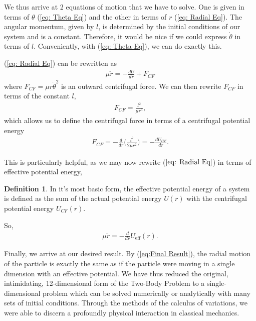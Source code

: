 \documentclass[10pt, psamsfonts]{amsart}
\theoremstyle{definition}
\newtheorem{defn}[thm]{Definition}
\theoremstyle{remark}
\numberwithin{equation}{section}
\begin{document}
We thus arrive at 2 equations of motion that we have to solve. One is given in terms of $\theta$ (\ref{eq: Theta Eq}) and the other in terms of $r$ (\ref{eq: Radial Eq}). The angular momentum, given by $l$, is determined by the initial conditions of our system and is a constant. Therefore, it would be nice if we could express $\dot{\theta}$ in terms of $l$. Conveniently, with (\ref{eq: Theta Eq}), we can do exactly this.

(\ref{eq: Radial Eq}) can be rewritten as 
\begin{align*}
  \label{eq:}
  \mu \ddot{r} = -\frac{dU}{dr} + F_{CF}
\end{align*}
where $F_{CF} = \mu r \dot{\theta}^2$ is an outward centrifugal force. We can then rewrite $F_{CF}$ in terms of the constant $l$,
\begin{gather*}
  F_{CF} = \frac{l^2}{\mu r^3},
\end{gather*}
which allows us to define the centrifugal force in terms of a centrifugal potential energy 
\begin{gather*}
  F_{CF} = -\frac{d}{dr} \bigg(\frac{l^2}{2\mu r^2}  \bigg) =  -\frac{dU_{CF}}{dr}.
\end{gather*}

This is particularly helpful, as we may now rewrite ($\ref{eq: Radial Eq}$) in terms of effective potential energy,
\begin{defn}
  In it's most basic form, the effective potential energy of a system is defined as the sum of the actual potential energy $U(r)$ with the centrifugal potential energy $U_{CF}(r)$.
\end{defn}
\noindent So, 
\begin{align}
  \label{eq:Final Result}
  \mu \ddot{r} = -\frac{d}{dr} U_{\text{eff}}(r).
\end{align}

Finally, we arrive at our desired result. By (\ref{eq:Final Result}), the radial motion of the particle is exactly the same as if the particle were moving in a single dimension with an effective potential. We have thus reduced the original, intimidating, 12-dimensional form of the Two-Body Problem to a single-dimensional problem which can be solved numerically or analytically with many sets of initial conditions. Through the methods of the calculus of variations, we were able to discern a profoundly physical interaction in classical mechanics.




\newpage
\end{document}
